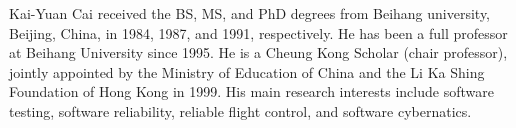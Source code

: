 \documentclass[10pt,journal,compsoc]{IEEEtran}
\begin{document}
\vspace{-10ex}
\begin{IEEEbiography}{Kai-Yuan Cai} received the BS, MS, and PhD degrees from Beihang university, Beijing, China, in 1984, 1987, and 1991, respectively. He has been a full professor at Beihang University since 1995. He is a Cheung Kong Scholar (chair professor), jointly appointed by the Ministry of Education of China and the Li Ka Shing Foundation of Hong Kong in 1999. His main research interests include software testing, software reliability, reliable flight control, and software cybernatics.
\end{IEEEbiography}
\end{document}
